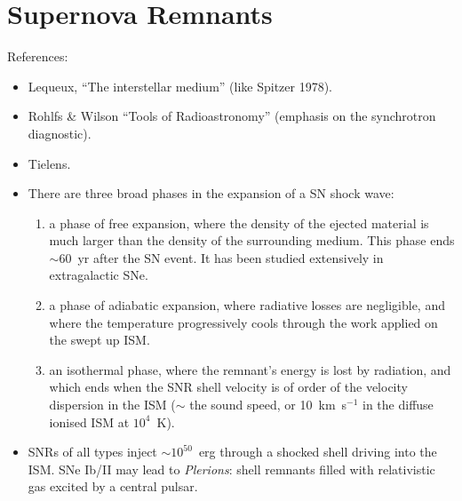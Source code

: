 \section{Supernova Remnants}




\begin{frame}{}

References: 

\begin{itemize}

\item Lequeux, ``The interstellar medium'' (like Spitzer 1978).
\item Rohlfs \& Wilson ``Tools of Radioastronomy'' (emphasis on the
  synchrotron diagnostic). 
\item Tielens.
\end{itemize}

\end{frame}



\begin{frame}{}


\begin{itemize}

\item There are three broad phases in the expansion of a SN shock
  wave:

\begin{enumerate}
\item a phase of free expansion, where the density of the ejected
  material is much larger than the density of the surrounding
  medium. This phase ends $\sim$60~yr after the SN event. It has been
  studied extensively in extragalactic SNe.

\item a phase of adiabatic expansion, where radiative losses are
  negligible, and where the temperature progressively cools through
  the work applied on the swept up ISM. 

\item an isothermal phase, where the remnant's energy is lost by
  radiation, and which ends when the SNR shell velocity is of order of
  the velocity dispersion in the ISM ($\sim$ the sound speed, or
  10~km~s$^{-1}$ in the diffuse ionised ISM at $10^4$~K).  

\end{enumerate}


\item SNRs of all types inject $\sim 10^{50}$~erg through a shocked
  shell driving into the ISM. SNe Ib/II may lead to {\em Plerions}:
 shell remnants filled with relativistic gas excited by a central
 pulsar. 

\end{itemize}

\end{frame}




